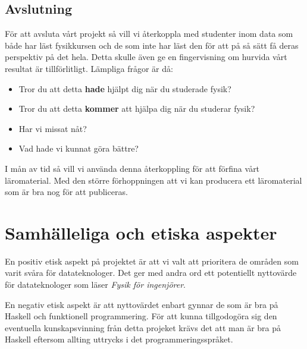 \documentclass[12pt,a4paper]{article}
\begin{document}

\subsection{Avslutning}

För att avsluta vårt projekt så vill vi återkoppla med studenter inom data som både har läst fysikkursen och de som inte har läst den för att på så sätt få deras perspektiv på det hela. Detta skulle även ge en fingervisning om hurvida vårt resultat är tillförlitligt. Lämpliga frågor är då:

\begin{itemize}
    \item Tror du att detta \textbf{hade} hjälpt dig när du studerade fysik?
    \item Tror du att detta \textbf{kommer} att hjälpa dig när du studerar fysik?
    \item Har vi missat nåt?
    \item Vad hade vi kunnat göra bättre?
\end{itemize}

I mån av tid så vill vi använda denna återkoppling för att förfina vårt läromaterial. Med den större förhoppningen att vi kan producera ett läromaterial som är bra nog för att publiceras.

\section{Samhälleliga och etiska aspekter}

En positiv etisk aspekt på projektet är att vi valt att prioritera de områden som varit svåra för datateknologer. Det ger med andra ord ett potentiellt nyttovärde för datateknologer som läser \textit{Fysik för ingenjörer}.

En negativ etisk aspekt är att nyttovärdet enbart gynnar de som är bra på Haskell och funktionell programmering. För att kunna tillgodogöra sig den eventuella kunskapsvinning från detta projeket krävs det att man är bra på Haskell eftersom allting uttrycks i det programmeringsspråket.
\end{document}
